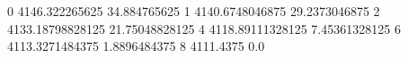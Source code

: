 0 4146.322265625 34.884765625
1 4140.6748046875 29.2373046875
2 4133.18798828125 21.75048828125
4 4118.89111328125 7.45361328125
6 4113.3271484375 1.8896484375
8 4111.4375 0.0
